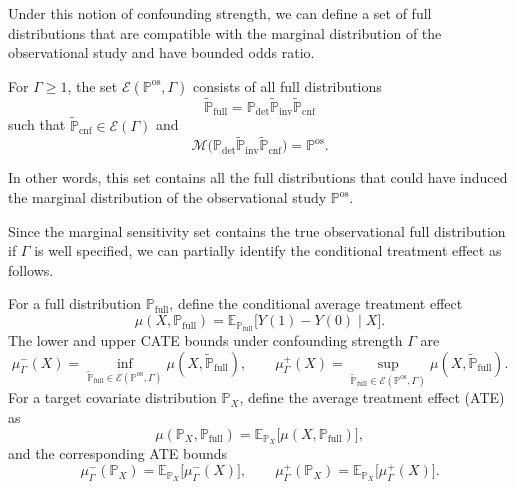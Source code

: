 Under this notion of confounding strength, we can define a set of full distributions that are compatible with the marginal distribution of the observational study and have bounded odds ratio.
\begin{definition}
\label{def:confounding-msm}
For \(\Gamma \geq 1\), the set \(\mathcal{E}(\mathbb{P}^{\mathrm{os}},\Gamma)\) consists of all full distributions
\[
  \widetilde{\mathbb{P}}_{\mathrm{full}}
  =
  \mathbb{P}_{\mathrm{det}}
  \widetilde{\mathbb{P}}_{\mathrm{inv}}
  \widetilde{\mathbb{P}}_{\mathrm{cnf}}
\]
such that \(\widetilde{\mathbb{P}}_{\mathrm{cnf}}\in\mathcal{E}(\Gamma)\) and
\[
  \mathcal{M}\bigl(
  \mathbb{P}_{\mathrm{det}}
  \widetilde{\mathbb{P}}_{\mathrm{inv}}
  \widetilde{\mathbb{P}}_{\mathrm{cnf}}
  \bigr)
  =
  \mathbb{P}^{\mathrm{os}}.
\]
\end{definition}
In other words, this set contains all the full distributions that could have induced the marginal distribution of the observational study \(\mathbb{P}^{\mathrm{os}}\).

Since the marginal sensitivity set contains the true observational full distribution if \(\Gamma\) is well specified, we can partially identify the conditional treatment effect as follows.
\begin{definition}
\label{def:confounding-sensitivity-bounds}
For a full distribution \(\mathbb{P}_{\mathrm{full}}\), define the conditional average treatment effect
\[
  \mu(X,\mathbb{P}_{\mathrm{full}})
  =
  \mathbb{E}_{\mathbb{P}_{\mathrm{full}}}
  \bigl[Y(1)-Y(0)\mid X\bigr].
\]
The lower and upper CATE bounds under confounding strength \(\Gamma\) are
\[
  \mu^-_{\Gamma}(X)
  =
  \inf_{\widetilde{\mathbb{P}}_{\mathrm{full}}
  \in
  \mathcal{E}(\mathbb{P}^{\mathrm{os}},\Gamma)}
  \mu(X,\widetilde{\mathbb{P}}_{\mathrm{full}}),
  \qquad
  \mu^+_{\Gamma}(X)
  =
  \sup_{\widetilde{\mathbb{P}}_{\mathrm{full}}
  \in
  \mathcal{E}(\mathbb{P}^{\mathrm{os}},\Gamma)}
  \mu(X,\widetilde{\mathbb{P}}_{\mathrm{full}}).
\]
For a target covariate distribution \(\mathbb{P}_X\), define the average treatment effect (ATE) as
\[
  \mu(\mathbb{P}_X,\mathbb{P}_{\mathrm{full}})
  =
  \mathbb{E}_{\mathbb{P}_X}
  \bigl[\mu(X,\mathbb{P}_{\mathrm{full}})\bigr],
\]
and the corresponding ATE bounds
\[
  \mu^-_{\Gamma}(\mathbb{P}_X)
  =
  \mathbb{E}_{\mathbb{P}_X}\bigl[\mu^-_{\Gamma}(X)\bigr],
  \qquad
  \mu^+_{\Gamma}(\mathbb{P}_X)
  =
  \mathbb{E}_{\mathbb{P}_X}\bigl[\mu^+_{\Gamma}(X)\bigr].
\]
\end{definition}

